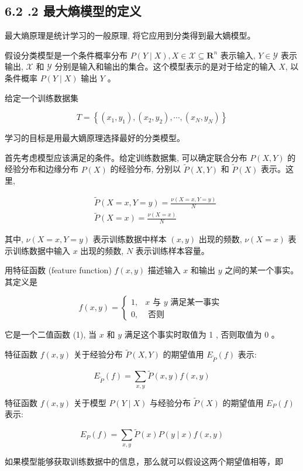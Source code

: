 \documentclass[10pt]{article}
\begin{document}
\begin{CJK*}{UTF8}{bsmi}
\section*{6.2 .2 最大熵模型的定义}
最大熵原理是统计学习的一般原理, 将它应用到分类得到最大嫡模型。

假设分类模型是一个条件概率分布 $P(Y \mid X), X \in \mathcal{X} \subseteq \boldsymbol{R}^{n}$ 表示输入, $Y \in \mathcal{Y}$ 表示输出, $\mathcal{X}$ 和 $\mathcal{Y}$ 分别是输入和输出的集合。这个模型表示的是对于给定的输入 $X$, 以条件概率 $P(Y \mid X)$ 输出 $Y$ 。

给定一个训练数据集

$$
T=\left\{\left(x_{1}, y_{1}\right),\left(x_{2}, y_{2}\right), \cdots,\left(x_{N}, y_{N}\right)\right\}
$$

学习的目标是用最大嫡原理选择最好的分类模型。

首先考虑模型应该满足的条件。给定训练数据集, 可以确定联合分布 $P(X, Y)$ 的经验分布和边缘分布 $P(X)$ 的经验分布, 分别以 $\tilde{P}(X, Y)$ 和 $\tilde{P}(X)$ 表示。这里,

$$
\begin{aligned}
& \tilde{P}(X=x, Y=y)=\frac{\nu(X=x, Y=y)}{N} \\
& \tilde{P}(X=x)=\frac{\nu(X=x)}{N}
\end{aligned}
$$

其中, $\nu(X=x, Y=y)$ 表示训练数据中样本 $(x, y)$ 出现的频数, $\nu(X=x)$ 表示训练数据中输入 $x$ 出现的频数, $N$ 表示训练样本容量。

用特征函数 (feature function) $f(x, y)$ 描述输入 $x$ 和输出 $y$ 之间的某一个事实。其定义是

$$
f(x, y)= \begin{cases}1, & x \text { 与 } y \text { 满足某一事实 } \\ 0, & \text { 否则 }\end{cases}
$$

它是一个二值函数 (1), 当 $x$ 和 $y$ 满足这个事实时取值为 1 , 否则取值为 0 。

特征函数 $f(x, y)$ 关于经验分布 $\tilde{P}(X, Y)$ 的期望值用 $E_{\tilde{P}}(f)$ 表示:

$$
E_{\tilde{P}}(f)=\sum_{x, y} \tilde{P}(x, y) f(x, y)
$$

特征函数 $f(x, y)$ 关于模型 $P(Y \mid X)$ 与经验分布 $\tilde{P}(X)$ 的期望值用 $E_{P}(f)$ 表示:

$$
E_{P}(f)=\sum_{x, y} \tilde{P}(x) P(y \mid x) f(x, y)
$$

如果模型能够获取训练数据中的信息，那么就可以假设这两个期望值相等，即



\end{CJK*}
\end{document}

